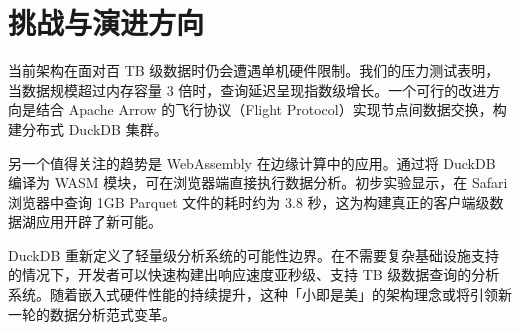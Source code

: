 \chapter{挑战与演进方向}
当前架构在面对百 TB 级数据时仍会遭遇单机硬件限制。我们的压力测试表明，当数据规模超过内存容量 3 倍时，查询延迟呈现指数级增长。一个可行的改进方向是结合 Apache Arrow 的飞行协议（Flight Protocol）实现节点间数据交换，构建分布式 DuckDB 集群。\par
另一个值得关注的趋势是 WebAssembly 在边缘计算中的应用。通过将 DuckDB 编译为 WASM 模块，可在浏览器端直接执行数据分析。初步实验显示，在 Safari 浏览器中查询 1GB Parquet 文件的耗时约为 3.8 秒，这为构建真正的客户端级数据湖应用开辟了新可能。\par
DuckDB 重新定义了轻量级分析系统的可能性边界。在不需要复杂基础设施支持的情况下，开发者可以快速构建出响应速度亚秒级、支持 TB 级数据查询的分析系统。随着嵌入式硬件性能的持续提升，这种「小即是美」的架构理念或将引领新一轮的数据分析范式变革。\par
